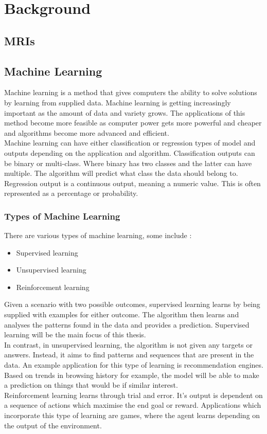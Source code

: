 \chapter{Background}
\section{MRIs}

\section{Machine Learning}
Machine learning is a method that gives computers the ability to solve solutions by learning from supplied data. Machine learning is getting increasingly important as the amount of data and variety grows. The applications of this method become more feasible as computer power gets more powerful and cheaper and algorithms become more advanced and efficient. 
\\[1\baselineskip]
Machine learning can have either classification or regression types of model and outputs depending on the application and algorithm. Classification outputs can be binary or multi-class. Where binary has two classes and the latter can have multiple. The algorithm will predict what class the data should belong to. Regression output is a continuous output, meaning a numeric value. This is often represented as a percentage or probability.  

\subsection{Types of Machine Learning}
There are various types of machine learning, some include \cite{ref:ml_1}:
\begin{itemize}
	\item Supervised learning
	\item Unsupervised learning
	\item Reinforcement learning
\end{itemize}

Given a scenario with two possible outcomes, supervised learning learns by being supplied with examples for either outcome. The algorithm then learns and analyses the patterns found in the data and provides a prediction. Supervised learning will be the main focus of this thesis.
\\[1\baselineskip]
In contrast, in unsupervised learning, the algorithm is not given any targets or answers. Instead, it aims to find patterns and sequences that are present in the data. An example application for this type of learning is recommendation engines. Based on trends in browsing history for example, the model will be able to make a prediction on things that would be if similar interest.
\\[1\baselineskip]
Reinforcement learning learns through trial and error. It's output is dependent on a sequence of actions which maximise the end goal or reward. Applications which incorporate this type of learning are games, where the agent learns depending on the output of the environment.

